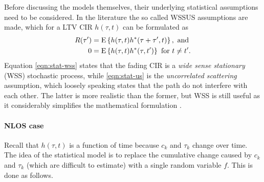 Before discussing the models themselves, their underlying statistical assumptions need to be considered. In the literature the so called WSSUS assumptions are made, which for a LTV CIR \(h(\tau, t)\) can be formulated as
\begin{subequations}
	\begin{align}
		R(\tau') &= \operatorname{E} \left\{h(\tau, t) h^*(\tau + \tau', t)\right\}, \text{ and } \label{eqn:stat-wss} \\
		0 &= \operatorname{E} \left\{h(\tau, t) h^*(\tau, t')\right\} \text { for } t \neq t'. \label{eqn:stat-us}
	\end{align}
\end{subequations}
Equation \eqref{eqn:stat-wss} states that the fading CIR is a \emph{wide sense stationary} (WSS) stochastic process, while \eqref{eqn:stat-us} is the \emph{uncorrelated scattering} assumption, which loosely speaking states that the path do not interfere with each other. The latter is more realistic than the former, but WSS is still useful as it considerably simplifies the mathematical formulation \cite{Messier}.

\paragraph{NLOS case}

Recall that \(h(\tau, t)\) is a function of time because \(c_k\) and \(\tau_k\) change over time. The idea of the statistical model is to replace the cumulative change caused by \(c_k\) and \(\tau_k\) (which are difficult to estimate) with a single random variable \(f\). This is done as follows.


